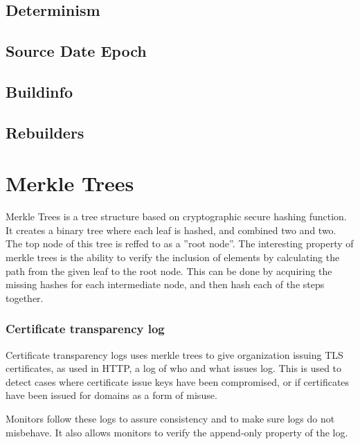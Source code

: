 \documentclass[../Main/thesis.tex]{subfiles}
\begin{document}
    \subsection*{Determinism}
    \subsection*{Source Date Epoch}
    \subsection*{Buildinfo}

    \subsection*{Rebuilders}%

\section{Merkle Trees}
Merkle Trees is a tree structure based on cryptographic secure hashing
function.\cite{ralph-c.-merkle-1998} It creates a binary tree where each leaf
is hashed, and combined two and two. The top node of this tree is reffed to as a
''root node''. The interesting property of merkle trees is the ability to verify
the inclusion of elements by calculating the path from the given leaf to the
root node. This can be done by acquiring the missing hashes for each
intermediate node, and then hash each of the steps together.


    \subsubsection*{Certificate transparency log}
    Certificate transparency logs uses merkle trees to give organization issuing
    TLS certificates, as used in HTTP, a log of who and what issues
    log.\cite{b.-laurie-a.-langley-e.kaster-google-2013} This is used to detect
    cases where certificate issue keys have been compromised, or if certificates
    have been issued for domains as a form of misuse.

    Monitors follow these logs to assure consistency and to make sure logs do
    not misbehave. It also allows monitors to verify the append-only property of
    the log.
\end{document}
